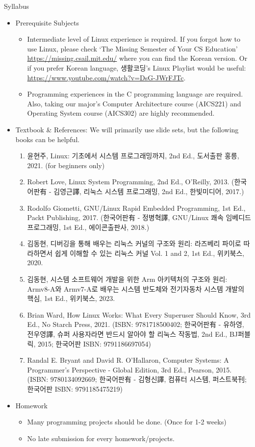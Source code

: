 \begin{frame}{Syllabus}
  \begin{itemize}
  \item Prerequisite Subjects
    \begin{itemize}
      \item Intermediate level of Linux experience is required. If you forgot how to use Linux, please check `The Missing Semester of Your CS Education' \url{https://missing.csail.mit.edu/} where you can find the Korean version. Or if you prefer Korean language, 생활코딩's Linux Playlist would be useful: \url{https://www.youtube.com/watch?v=DsG-JWrFJTc}.

      \item Programming experiences in the C programming language are required. Also, taking our major's Computer Architecture course (AICS221) and Operating System course (AICS302) are highly recommended.
    \end{itemize}
  \item Textbook \& References: We will primarily use slide sets, but the following books can be helpful.
    \begin{enumerate}
      \item 윤현주, Linux: 기초에서 시스템 프로그래밍까지, 2nd Ed., 도서출판 홍릉, 2021. (for beginners only)
      \item Robert Love, Linux System Programming, 2nd Ed., O'Reilly, 2013. (한국어판有 - 김영근譯, 리눅스 시스템 프로그래밍, 2nd Ed., 한빛미디어, 2017.)
      \item Rodolfo Giometti, GNU/Linux Rapid Embedded Programming, 1st Ed., Packt Publishing, 2017. (한국어판有 - 정병혁譯, GNU/Linux 쾌속 임베디드 프로그래밍, 1st Ed., 에이콘출판사, 2018.)
      \item 김동현, 디버깅을 통해 배우는 리눅스 커널의 구조와 원리: 라즈베리 파이로 따라하면서 쉽게 이해할 수 있는 리눅스 커널 Vol. 1 and 2, 1st Ed., 위키북스, 2020.
      \item 김동현, 시스템 소프트웨어 개발을 위한 Arm 아키텍처의 구조와 원리: Armv8-A와 Armv7-A로 배우는 시스템 반도체와 전기자동차 시스템 개발의 핵심, 1st Ed., 위키북스, 2023.
      \item Brian Ward, How Linux Works: What Every Superuser Should Know, 3rd Ed., No Starch Press, 2021. (ISBN: 9781718500402; 한국어판有 - 유하영, 전우영譯, 슈퍼 사용자라면 반드시 알아야 할 리눅스 작동법, 2nd Ed., BJ퍼블릭, 2015; 한국어판 ISBN: 9791186697054)
      \item Randal E. Bryant and David R. O'Hallaron, Computer Systems: A Programmer's Perspective - Global Edition, 3rd Ed., Pearson, 2015. (ISBN: 9780134092669; 한국어판有 - 김형신譯, 컴퓨터 시스템, 퍼스트북刊; 한국어판 ISBN: 9791185475219)
    \end{enumerate}
  \item Homework
    \begin{itemize}
      \item Many programming projects should be done. (Once for 1-2 weeks)
      \item No late submission for every homework/projects.      
    \end{itemize}
  \end{itemize}
\end{frame}


